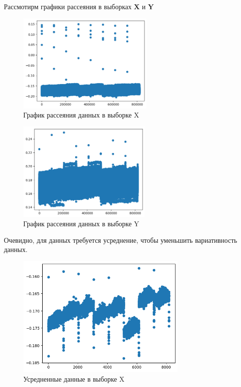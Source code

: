 \documentclass{article}
\begin{document}
 
\newpage
  Рассмотирм графики рассеяния в выборках \(\mathbf{X}\) и \(\mathbf{Y}\)
  \begin{figure}[htbp!]
    \begin{center}
        \includegraphics[width = 0.6\textwidth]{x_scatter}
        \caption{График рассеяния данных в выборке X}
  \label{figure:x_scatter}
    \end{center}
  \end{figure}

  \begin{figure}[htbp!]
  \begin{center}
      \includegraphics[width = 0.59\textwidth]{y_scatter}
      \caption{График рассеяния данных в выборке Y}
  \label{figure:y_scatter}
  \end{center}
  \end{figure}

  Очевидно, для данных требуется усреднение, чтобы уменьшить вариативность данных.

  \begin{figure}[htbp!]
    \begin{center}
        \includegraphics[width = 0.75\textwidth]{x_scatter_middle}
        \caption{Усредненные данные в выборке X}
  \label{figure:x_scatter_middle}
    \end{center}
  \end{figure}
\end{document}

